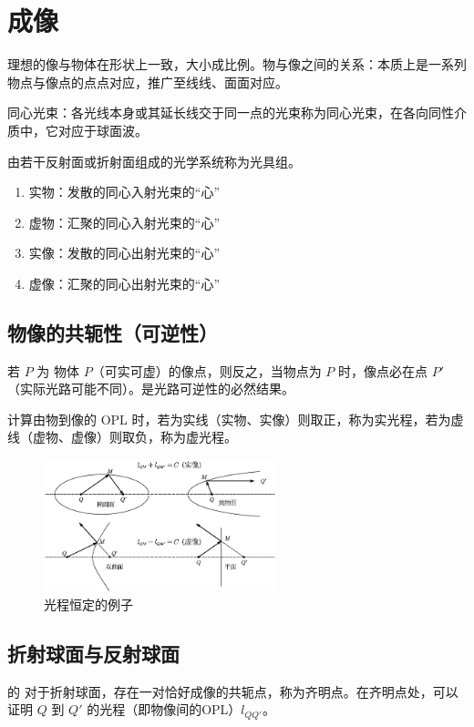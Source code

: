 \documentclass[UTF8]{report}
\theoremstyle{MyLineTheoremStyle} %
\theoremstyle{MyBlockTheoremStyle} %
\theoremstyle{MySubsubsectionStyle} %
\begin{document}
\section{成像}

理想的像与物体在形状上一致，大小成比例。物与像之间的关系：本质上是一系列物点与像点的点点对应，推广至线线、面面对应。

同心光束：各光线本身或其延长线交于同一点的光束称为同心光束，在各向同性介质中，它对应于球面波。

由若干反射面或折射面组成的光学系统称为光具组。

\begin{enumerate}
\item 实物：发散的同心入射光束的“心”
\item 虚物：汇聚的同心入射光束的“心”
\item 实像：发散的同心出射光束的“心”
\item 虚像：汇聚的同心出射光束的“心”
\end{enumerate}

\subsection{物像的共轭性（可逆性）}

若 $P$ 为 物体 $P$（可实可虚）的像点，则反之，当物点为 $P$ 时，像点必在点 $P'$（实际光路可能不同）。是光路可逆性的必然结果。 

计算由物到像的 OPL 时，若为实线（实物、实像）则取正，称为实光程，若为虚线（虚物、虚像）则取负，称为虚光程。

\begin{figure}[H]\centering
\includegraphics[width=0.6\textwidth]{assets/1,2/path2.pdf}
\caption{光程恒定的例子}\label{光程恒定的例子}
\end{figure}


\subsection{折射球面与反射球面}


的
对于折射球面，存在一对恰好成像的共轭点，称为齐明点。在齐明点处，可以证明 $Q$ 到 $Q'$ 的光程（即物像间的OPL）$l_{QQ'}$。
\end{document}
